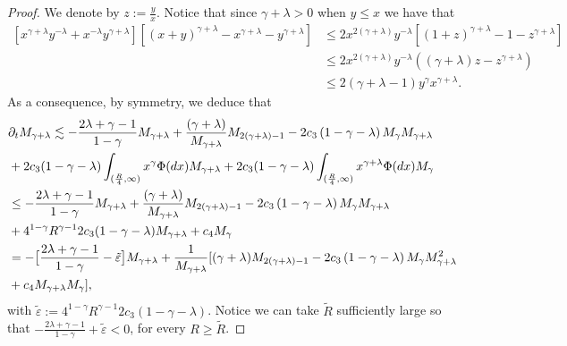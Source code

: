 \documentclass[10pt,a4paper]{amsart}
\newcommand{\der}{\textup{d}}
\begin{document}
\begin{proof}
We denote by $z:=\frac{y}{x}$. Notice that since $\gamma + \lambda >0$ when $y \leq x $ we have that 
\begin{align*}
 \left[x^{\gamma + \lambda} y^{-\lambda} + x^{-\lambda} y^{\gamma + \lambda} \right] \left[ (x+y)^{\gamma + \lambda} - x^{\gamma + \lambda} - y^{\gamma + \lambda} \right]& \leq 2  x^{2(\gamma + \lambda)} y^{-\lambda} [ (1+z)^{\gamma + \lambda} - 1- z^{\gamma + \lambda}  ]\\
& \leq 2 x^{2(\gamma + \lambda)} y^{-\lambda} \left( \left(\gamma + \lambda \right)z- z^{\gamma + \lambda} \right)\\
&\leq 2 (\gamma + \lambda -1 ) y^{\gamma} x^{\gamma + \lambda}. 
\end{align*}
As a consequence, by symmetry, we deduce that 
 \begin{align} \label{epsilon appears}
&\partial_{t}M_{\gamma +\lambda}  \lesssim - \frac{2\lambda + \gamma -1 }{1-\gamma} M_{\gamma+\lambda}
+ \frac{(\gamma +\lambda)}{M_{\gamma+\lambda}}  M_{2(\gamma+\lambda)-1} - 2c_{3} \left(1-\gamma-\lambda \right)
 M_{\gamma } M_{\gamma+ \lambda}\nonumber\\
 &+2c_{3}(1-\gamma-\lambda)\int_{(\frac{R}{4},\infty)}x^{\gamma}\Phi(\der x)M_{\gamma+\lambda}+2c_{3}(1-\gamma-\lambda)\int_{(\frac{R}{4},\infty)}x^{\gamma+\lambda}\Phi(\der x)M_{\gamma}\nonumber\\
 &\leq - \frac{2\lambda + \gamma -1 }{1-\gamma} M_{\gamma+\lambda}
+ \frac{(\gamma +\lambda)}{M_{\gamma+\lambda}}  M_{2(\gamma+\lambda)-1} -2c_{3} \left(1-\gamma-\lambda \right)
 M_{\gamma } M_{\gamma+ \lambda}\nonumber\\
 &+4^{1-\gamma}R^{\gamma-1}2c_{3}(1-\gamma-\lambda)M_{\gamma+\lambda}+c_{4}M_{\gamma}\nonumber\\
 &= - \big[\frac{2\lambda + \gamma -1 }{1-\gamma}-\tilde{\varepsilon}\big]M_{\gamma+\lambda}
+ \frac{1}{M_{\gamma+\lambda}} [ (\gamma +\lambda) M_{2(\gamma+\lambda)-1} - 2c_{3} \left(1-\gamma-\lambda \right)
 M_{\gamma } M_{\gamma+ \lambda}^2\nonumber\\
 &+c_{4}M_{\gamma+\lambda}M_{\gamma}],
\end{align}
with $\tilde{\varepsilon}:=4^{1-\gamma}R^{\gamma-1}2c_{3}(1-\gamma-\lambda)$. Notice we can take $\tilde{R}$ sufficiently large so that $- \frac{2\lambda + \gamma -1 }{1-\gamma}+\tilde{\varepsilon}<0$, for every $R\geq \tilde{R}$.


\end{proof}
\end{document}
